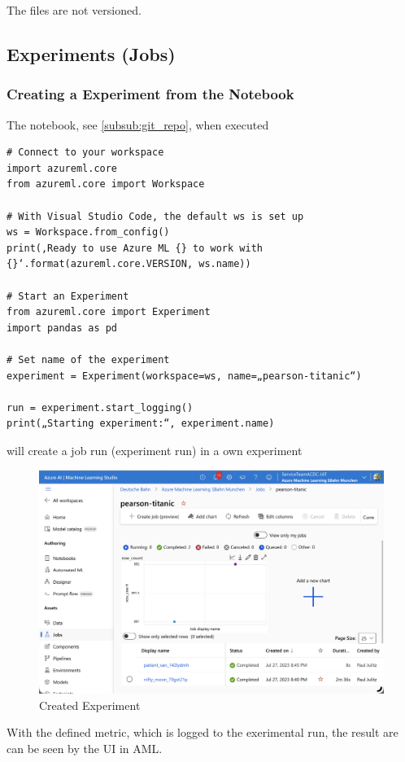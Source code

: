 The files are not versioned.


\subsection{Experiments (Jobs)}

\subsubsection{Creating a Experiment from the Notebook}

The notebook, see \ref{subsub:git_repo}, when executed
\begin{lstlisting}[style=Python]
# Connect to your workspace
import azureml.core
from azureml.core import Workspace

# With Visual Studio Code, the default ws is set up
ws = Workspace.from_config()
print(‚Ready to use Azure ML {} to work with {}‘.format(azureml.core.VERSION, ws.name))	

# Start an Experiment
from azureml.core import Experiment
import pandas as pd

# Set name of the experiment
experiment = Experiment(workspace=ws, name=„pearson-titanic“)

run = experiment.start_logging()
print(„Starting experiment:“, experiment.name)
\end{lstlisting}
will create a job run (experiment run) in a own experiment

\begin{figure}[H]
 	\centering
 	\includegraphics[scale = 0.3]{attachment/chapter_10/Scc050}
 	\caption{Created Experiment}
\end{figure}

With the defined metric, which is logged to the exerimental run, the result are can be seen by the UI in \gls{AML}.


